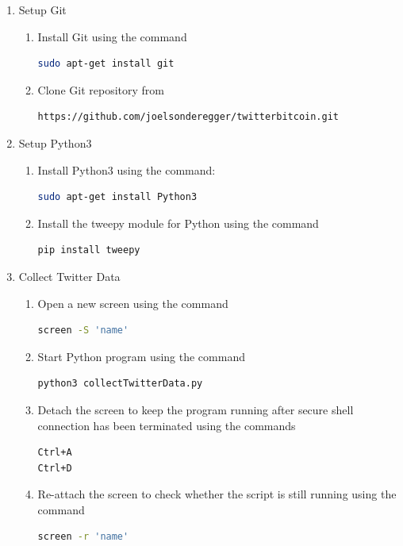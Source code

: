 \documentclass[a4paper,12pt]{article}
\begin{document}
\begin{spacing}{1.2}
\begin{enumerate}
\item Setup Git
\begin{enumerate}
\item Install Git using the command
\begin{lstlisting}[language=bash]
 sudo apt-get install git
\end{lstlisting}
\item Clone Git repository from
\begin{lstlisting}[language=bash] 
https://github.com/joelsonderegger/twitterbitcoin.git
\end{lstlisting}
\end{enumerate}

\item Setup Python3
\begin{enumerate}
\item Install Python3 using the command: \begin{lstlisting}[language=bash]
sudo apt-get install Python3
\end{lstlisting}
\item Install the tweepy module for Python using the command
\begin{lstlisting}[language=bash]
pip install tweepy
\end{lstlisting}
\end{enumerate}

\item Collect Twitter Data
\begin{enumerate}
\item Open a new screen using the command
\begin{lstlisting}[language=bash] 
screen -S 'name' 
\end{lstlisting}
\item Start Python program using the command
\begin{lstlisting}[language=bash]
python3 collectTwitterData.py
\end{lstlisting}
\item Detach the screen to keep the program running after secure shell connection has been terminated using the commands
\begin{lstlisting}[language=bash]
Ctrl+A
Ctrl+D
\end{lstlisting}
\item Re-attach the screen to check whether the script is still running using the command
\begin{lstlisting}[language=bash]
screen -r 'name'
\end{lstlisting}
\end{enumerate}


\end{enumerate}
\end{spacing}
\end{document}
